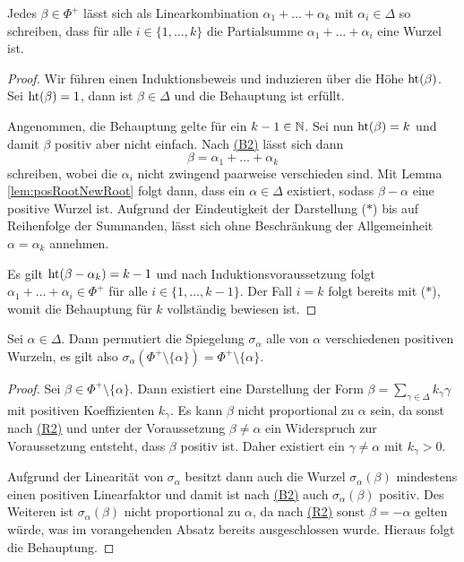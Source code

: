 \begin{cor}
  Jedes $\beta \in \Phi^+$ lässt sich als Linearkombination $\alpha_1 + \dots + \alpha_k$ mit $\alpha_i \in \Delta$ so schreiben, dass für alle $i \in \{1,\dots,k\}$ die Partialsumme $\alpha_1 + \dots + \alpha_i$ eine Wurzel ist.
\end{cor}

\begin{proof}
  Wir führen einen Induktionsbeweis und induzieren über die Höhe $\operatorname{ht}(\beta)$.
  Sei $\operatorname{ht}(\beta) = 1$, dann ist $\beta \in \Delta$ und die Behauptung ist erfüllt.

  Angenommen, die Behauptung gelte für ein $k-1 \in \mathbb{N}$.
  Sei nun $\operatorname{ht}(\beta) = k$ und damit $\beta$ positiv aber nicht einfach.
  Nach \hyperref[it:B2]{(B2)} lässt sich dann 
  \begin{displaymath}
    \beta = \alpha_1 + \dots + \alpha_k \tag{$\ast$}
  \end{displaymath}
  schreiben, wobei die $\alpha_i$ nicht zwingend paarweise verschieden sind.
  Mit Lemma \ref{lem:posRootNewRoot} folgt dann, dass ein $\alpha \in \Delta$ existiert, sodass $\beta - \alpha$ eine positive Wurzel ist.
  Aufgrund der Eindeutigkeit der Darstellung ($\ast$) bis auf Reihenfolge der Summanden, lässt sich ohne Beschränkung der Allgemeinheit $\alpha = \alpha_k$ annehmen.

  Es gilt $\operatorname{ht}(\beta - \alpha_{k}) = k - 1$ und nach Induktionsvoraussetzung folgt $\alpha_1 + \dots + \alpha_{i} \in \Phi^+$ für alle $i \in \{1,\dots,k-1\}$.
  Der Fall $i = k$ folgt bereits mit ($\ast$), womit die Behauptung für $k$ vollständig bewiesen ist.
\end{proof}

\begin{lem}
  \label{lem:permute}
  Sei $\alpha \in \Delta$. 
  Dann permutiert die Spiegelung $\sigma_\alpha$ alle von $\alpha$ verschiedenen positiven Wurzeln, es gilt also $\sigma_\alpha(\Phi^+ \setminus \{\alpha\}) = \Phi^+ \setminus \{\alpha\}$.
\end{lem}

\begin{proof}
  Sei $\beta \in \Phi^+ \setminus \{\alpha\}$. 
  Dann existiert eine Darstellung der Form $\beta = \sum_{\gamma \in \Delta} k_\gamma \gamma$ mit positiven Koeffizienten $k_\gamma$.
  Es kann $\beta$ nicht proportional zu $\alpha$ sein, da sonst nach \hyperref[it:R2]{(R2)} und unter der Voraussetzung $\beta \neq \alpha$ ein Widerspruch zur Voraussetzung entsteht, dass $\beta$ positiv ist.
  Daher existiert ein $\gamma \neq \alpha$ mit $k_\gamma > 0$.

  Aufgrund der Linearität von $\sigma_\alpha$ besitzt dann auch die Wurzel $\sigma_\alpha(\beta)$ mindestens einen positiven Linearfaktor und damit ist nach \hyperref[it:B2]{(B2)} auch $\sigma_\alpha(\beta)$ positiv.
  Des Weiteren ist $\sigma_\alpha(\beta)$ nicht proportional zu $\alpha$, da nach \hyperref[it:R2]{(R2)} sonst $\beta = -\alpha$ gelten würde, was im vorangehenden Absatz bereits ausgeschlossen wurde.
  Hieraus folgt die Behauptung.
\end{proof}

